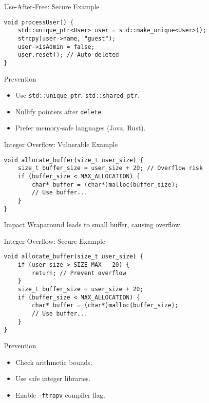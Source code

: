 \documentclass[12pt]{beamer}
\begin{document}
\begin{frame}[fragile]{Use-After-Free: Secure Example}
  \begin{lstlisting}[style=cppstyle]
void processUser() {
    std::unique_ptr<User> user = std::make_unique<User>();
    strcpy(user->name, "guest");
    user->isAdmin = false;
    user.reset(); // Auto-deleted
}
  \end{lstlisting}
  \begin{block}{Prevention}
    \begin{itemize}
      \item Use \texttt{std::unique_ptr}, \texttt{std::shared_ptr}.
      \item Nullify pointers after \texttt{delete}.
      \item Prefer memory-safe languages (Java, Rust).
    \end{itemize}
  \end{block}
\end{frame}

\begin{frame}[fragile]{Integer Overflow: Vulnerable Example}
  \begin{lstlisting}[style=cppstyle]
void allocate_buffer(size_t user_size) {
    size_t buffer_size = user_size + 20; // Overflow risk
    if (buffer_size < MAX_ALLOCATION) {
        char* buffer = (char*)malloc(buffer_size);
        // Use buffer...
    }
}
  \end{lstlisting}
  \begin{alertblock}{Impact}
    Wraparound leads to small buffer, causing overflow.
  \end{alertblock}
\end{frame}

\begin{frame}[fragile]{Integer Overflow: Secure Example}
  \begin{lstlisting}[style=cppstyle]
void allocate_buffer(size_t user_size) {
    if (user_size > SIZE_MAX - 20) {
        return; // Prevent overflow
    }
    size_t buffer_size = user_size + 20;
    if (buffer_size < MAX_ALLOCATION) {
        char* buffer = (char*)malloc(buffer_size);
        // Use buffer...
    }
}
  \end{lstlisting}
  \begin{block}{Prevention}
    \begin{itemize}
      \item Check arithmetic bounds.
      \item Use safe integer libraries.
      \item Enable \texttt{-ftrapv} compiler flag.
    \end{itemize}
  \end{block}
\end{frame}
\end{document}
